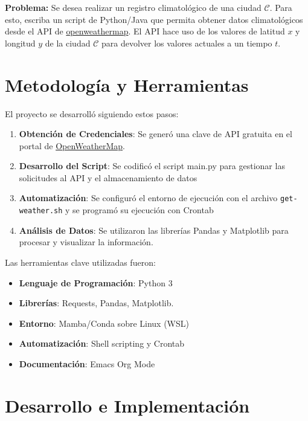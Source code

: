 \documentclass[11pt]{article}
\begin{document}
\textbf{\textbf{Problema:}}
Se desea realizar un registro climatológico de una ciudad
\(\mathcal{C}\). Para esto, escriba un script de Python/Java que permita
obtener datos climatológicos desde el API de \href{https://openweathermap.org/current\#one}{openweathermap}. El API
hace uso de los valores de latitud \(x\) y longitud \(y\) de la ciudad
\(\mathcal{C}\) para devolver los valores actuales a un tiempo \(t\).



\section{Metodología y Herramientas}
\label{sec:orge27fc2b}

El proyecto se desarrolló siguiendo estos pasos:

\begin{enumerate}
\item \textbf{Obtención de Credenciales}: Se generó una clave de API gratuita en el portal de \href{https://openweathermap.org/current\#one}{OpenWeatherMap}.
\item \textbf{Desarrollo del Script}: Se codificó el script main.py para gestionar las
solicitudes al API y el almacenamiento de datos
\item \textbf{Automatización}: Se configuró el entorno de ejecución con el archivo \texttt{get-weather.sh} y
se programó su ejecución con Crontab
\item \textbf{Análisis de Datos}: Se utilizaron las librerías Pandas y Matplotlib para procesar
y visualizar la información.
\end{enumerate}

Las herramientas clave utilizadas fueron:
\begin{itemize}
\item \textbf{Lenguaje de Programación}: Python 3
\item \textbf{Librerías}: Requests, Pandas, Matplotlib.
\item \textbf{Entorno}: Mamba/Conda sobre Linux (WSL)
\item \textbf{Automatización}: Shell scripting y Crontab
\item \textbf{Documentación}: Emacs Org Mode
\end{itemize}

\section{Desarrollo e Implementación}
\label{sec:org7fe217b}
\end{document}
